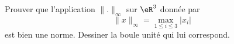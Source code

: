 \begin{exercice}\label{exoGeomAnal-0005}

	Prouver que l'application $\| . \|_{\infty}$ sur $\eR^3$ donnée par
	\begin{equation}
		\| x \|_{\infty}=\max_{1\leq i\leq 3}| x_i |
	\end{equation}
	est bien une norme. Dessiner la boule unité qui lui correspond. 

\end{exercice}
